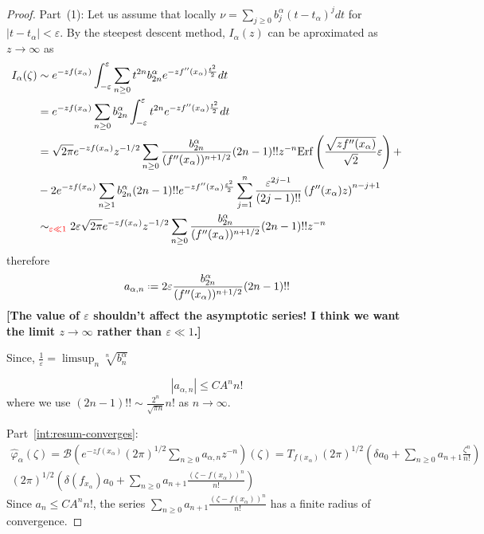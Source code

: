 \documentclass[11pt,a4paper,twoside,leqno,noamsfonts]{amsart}
\numberwithin{equation}{section}
\begin{document}
\begin{proof}
\color{violet}
Part~(1): Let us assume that locally $\nu=\sum_{j\geq 0}b_j^{\alpha}(t-t_{\alpha})^{j}dt$ for $|t-t_\alpha|<\varepsilon$. By the steepest descent method, $I_\alpha(z)$ can be aproximated as $z\to\infty$ as
\begin{align*}
I_\alpha(\zeta)&\sim e^{-zf(x_\alpha)}\int_{-\varepsilon}^{\varepsilon}\sum_{n\geq 0}t^{2n}b_{2n}^{\alpha}e^{-zf''(x_\alpha)\frac{t^2}{2}}dt\\
&=e^{-zf(x_\alpha)}\sum_{n\geq 0}b_{2n}^{\alpha}\int_{-\varepsilon}^{\varepsilon}t^{2n}e^{-zf''(x_{\alpha})\frac{t^2}{2}}dt\\
&=\sqrt{2\pi}e^{-zf(x_\alpha)}z^{-1/2}\sum_{n\geq 0}\frac{b_{2n}^{\alpha}}{(f''(x_{\alpha}))^{n+1/2}}(2n-1)!! z^{-n}\mathrm{Erf}\left(\frac{\sqrt{z f''(x_\alpha)}}{\sqrt{2}}\varepsilon\right)+\\
&-2e^{-zf(x_\alpha)}\sum_{n\geq 1}b_{2n}^{\alpha}(2n-1)!!e^{-zf''(x_{\alpha})\frac{\varepsilon^2}{2}}\sum_{j=1}^n\frac{\varepsilon^{2j-1}}{(2j-1)!!}\left(f''(x_\alpha)z\right)^{n-j+1}\\
&\sim_{\textcolor{red}{\varepsilon \ll 1}} 2\varepsilon \sqrt{2\pi}e^{-zf(x_\alpha)}z^{-1/2}\sum_{n\geq 0}\frac{b_{2n}^{\alpha}}{(f''(x_{\alpha}))^{n+1/2}}(2n-1)!! z^{-n}
\end{align*} 
therefore \[a_{\alpha,n}\defeq 2\varepsilon\frac{b_{2n}^{\alpha}}{(f''(x_{\alpha}))^{n+1/2}}(2n-1)!!\]
\textbf{[The value of $\varepsilon$ shouldn't affect the asymptotic series! I think we want the limit $z \to \infty$ rather than $\varepsilon \ll 1$.]}

Since, $\tfrac{1}{\varepsilon}=\limsup_{n}\sqrt[n]{b_{n}^{\alpha}}$

\[|a_{\alpha,n}|\leq CA^n n!\]
where we use $(2n-1)!!\sim \tfrac{2^n}{\sqrt{\pi n}}n!$ as $n\to \infty$.
\color{black}

Part~\eqref{int:resum-converges}: \begin{align*}
\hat{\varphi}_\alpha(\zeta)=\mathcal{B}\left(e^{-zf(x_\alpha)}(2\pi)^{1/2} \sum_{n\geq 0}a_{\alpha,n}z^{-n}\right)(\zeta)=T_{f(x_\alpha)}(2\pi)^{1/2} \left(\delta a_0+\sum_{n\geq 0}a_{n+1}\frac{\zeta^n}{n!}\right)\\
(2\pi)^{1/2} \left(\delta(f_{x_\alpha}) a_0+\sum_{n\geq 0}a_{n+1}\frac{(\zeta-f(x_\alpha))^n}{n!}\right)
\end{align*}
Since $a_{n}\leq CA^nn!$, the series $\sum_{n\geq 0}a_{n+1}\frac{(\zeta-f(x_\alpha))^n}{n!}$ has a finite radius of convergence. 


\end{proof}
\end{document}
